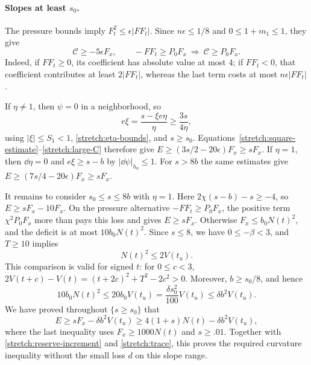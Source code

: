 \paragraph{Slopes at least $s_0$.}
The pressure bounds imply $F_t^2\le\epsilon|FF_t|$.  Since
$n\epsilon\le1/8$ and $0\le1+m_1\le1$, they give
\begin{equation}\label{stretch:large-C}
 \mathcal C\ge-5\epsilon F_x,\qquad
 -FF_t\ge P_0F_x\ \Longrightarrow\ \mathcal C\ge P_0F_x.
\end{equation}
Indeed, if $FF_t\ge0$, its coefficient has absolute value at most $4$;
if $FF_t<0$, that coefficient contributes at least $2|FF_t|$, whereas
the last term costs at most $n\epsilon|FF_t|$.

If $\eta\ne1$, then $\psi=0$ in a neighborhood, so
\[
 e\xi=\frac{s-\xi e\eta}{\eta}\ge\frac{3s}{4\eta},
\]
using $|\xi|\le S_1<1$, \eqref{stretch:eta-bounds}, and $s\ge s_0$.
Equations~\eqref{stretch:square-estimate}--\eqref{stretch:large-C}
therefore give
$E\ge(3s/2-20\epsilon)F_x\ge sF_x$.
If $\eta=1$, then $\dd\eta=0$ and
$e\xi\ge s-b$ by $|\dd\psi|_{h_0}\le1$.
For $s>8b$ the same estimates give
$E\ge(7s/4-20\epsilon)F_x\ge sF_x$.

It remains to consider $s_0\le s\le8b$ with $\eta=1$.
Here $2\chi(s-b)-s\ge-4$, so $E\ge sF_x-10F_x$.
On the pressure alternative $-FF_t\ge P_0F_x$, the positive term
$\chi^2P_0F_x$ more than pays this loss and gives $E\ge sF_x$.
Otherwise $F_x\le b_0N(t)^2$, and the deficit is at most
$10b_0N(t)^2$.  Since $s\le8$, we have $0\le-\beta<3$, and $T\ge10$
implies
\[
 N(t)^2\le2V(t_u).
\]
This comparison is valid for signed $t$: for $0\le c<3$,
$2V(t+c)-V(t)=(t+2c)^2+T^2-2c^2>0$.
Moreover, $b\ge s_0/8$, and hence
\[
 10b_0N(t)^2\le20b_0V(t_u)
 =\frac{\delta s_0^2}{100}V(t_u)
 \le\delta b^2V(t_u).
\]
We have proved throughout $\{s\ge s_0\}$ that
\begin{equation}\label{stretch:large-slope}
 E\ge sF_x-\delta b^2V(t_u)
   \ge4(1+s)N(t)-\delta b^2V(t_u),
\end{equation}
where the last inequality uses $F_x\ge1000N(t)$ and $s\ge.01$.
Together with \eqref{stretch:reserve-increment} and
\eqref{stretch:trace}, this proves the required curvature inequality
without the small loss $d$ on this slope range.

